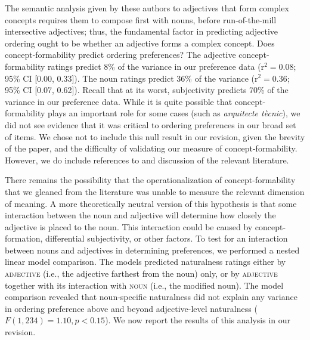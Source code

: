 \documentclass[12pt]{article}
\begin{document}
The semantic analysis given by these authors to adjectives that form complex concepts requires them to compose first with nouns, before run-of-the-mill intersective adjectives; thus, the fundamental factor in predicting adjective ordering ought to be whether an adjective forms a complex concept. Does concept-formability predict ordering preferences?
The adjective concept-formability ratings predict 8\% of the variance in our preference data (r$^{2}=0.08$; 95\% CI [0.00,  0.33]). The noun ratings predict 36\% of the variance (r$^{2}=0.36$; 95\% CI [0.07,  0.62]). Recall that at its worst, subjectivity predicts 70\% of the variance in our preference data.
While it is quite possible that concept-formability plays an important role for some cases (such as \emph{arquitecte t\`{e}cnic}), we did not see evidence that it was critical to ordering preferences in our broad set of items. We chose not to include this null result in our revision, given the brevity of the paper, and the difficulty of validating our measure of concept-formability. 
However, we do include references to and discussion of the relevant literature. 

There remains the possibility that the operationalization of concept-formability that we gleaned from the literature was unable to measure the relevant dimension of meaning. A more theoretically neutral version of this hypothesis is that some interaction between the noun and adjective will determine how closely the adjective is placed to the noun. This interaction could be caused by concept-formation, differential subjectivity, or other factors. To test for an interaction between nouns and adjectives in determining preferences, we performed a nested linear model comparison. The models predicted naturalness ratings either by \textsc{adjective} (i.e., the adjective farthest from the noun) only, or by \textsc{adjective} together with its interaction with \textsc{noun} (i.e., the modified noun).	The model comparison revealed  that noun-specific naturalness did not explain any variance in ordering preference above and beyond adjective-level naturalness ($F(1,234) = 1.10, p < 0.15$). We now report the results of this analysis in our revision.
\end{document}
